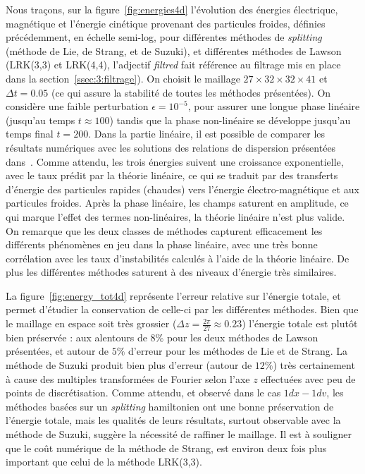 Nous traçons, sur la figure~\ref{fig:energies4d} l'évolution des énergies électrique, magnétique et l'énergie cinétique provenant des particules froides, définies précédemment, en échelle semi-log, pour différentes méthodes de \emph{splitting} (méthode de Lie, de Strang, et de Suzuki), et différentes méthodes de Lawson (LRK(3,3) et LRK(4,4), l'adjectif \emph{filtred} fait référence au filtrage mis en place dans la section~\ref{ssec:3:filtrage}). On choisit le maillage $27\times32\times32\times41$ et $\Delta t=0.05$ (ce qui assure la stabilité de toutes les méthodes présentées). On considère une faible perturbation $\epsilon = 10^{-5}$, pour assurer une longue phase linéaire (jusqu'au temps $t\approx 100$) tandis que la phase non-linéaire se développe jusqu'au temps final $t=200$. Dans la partie linéaire, il est possible de comparer les résultats numériques avec les solutions des relations de dispersion présentées dans~\cite{Holderied:2020}. Comme attendu, les trois énergies suivent une croissance exponentielle, avec le taux prédit par la théorie linéaire, ce qui se traduit par des transferts d'énergie des particules rapides (chaudes) vers l'énergie électro-magnétique et aux particules froides. Après la phase linéaire, les champs saturent en amplitude, ce qui marque l'effet des termes non-linéaires, la théorie linéaire n'est plus valide. On remarque que les deux classes de méthodes capturent efficacement les différents phénomènes en jeu dans la phase linéaire, avec une très bonne corrélation avec les taux d'instabilités calculés à l'aide de la théorie linéaire. De plus les différentes méthodes saturent à des niveaux d'énergie très similaires.

La figure~\ref{fig:energy_tot4d} représente l'erreur relative sur l'énergie totale, et permet d'étudier la conservation de celle-ci par les différentes méthodes. Bien que le maillage en espace soit très grossier ($\Delta z = \frac{2\pi}{27} \approx 0.23$) l'énergie totale est plutôt bien préservée : aux alentours de $8\%$ pour les deux méthodes de Lawson présentées, et autour de $5\%$ d'erreur pour les méthodes de Lie et de Strang. La méthode de Suzuki produit bien plus d'erreur (autour de $12\%$) très certainement à cause des multiples transformées de Fourier selon l'axe $z$ effectuées avec peu de points de discrétisation. Comme attendu, et observé dans le cas $1dx-1dv$, les méthodes basées sur un \emph{splitting} hamiltonien ont une bonne préservation de l'énergie totale, mais les qualités de leurs résultats, surtout observable avec la méthode de Suzuki, suggère la nécessité de raffiner le maillage. Il est à souligner que le coût numérique de la méthode de Strang, est environ deux fois plus important que celui de la méthode LRK(3,3).

